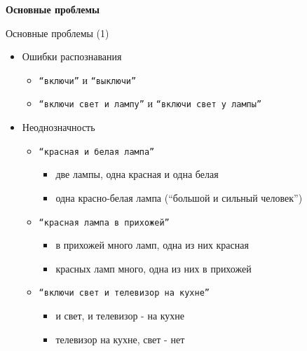 \documentclass{beamer}
\begin{document}
\begin{frame}{}
\begin{center}
	\textbf{Основные проблемы}\\
\end{center}
\end{frame}


\begin{frame}{Основные проблемы (1)}
\begin{itemize}
	\item Ошибки распознавания
	\bigskip
		\begin{itemize}
			\item \texttt{``включи''} и \texttt{``выключи''}
			\item \texttt{``включи свет и лампу''} и \texttt{``включи свет у лампы''}
		\end{itemize}
		\bigskip
	\item Неоднозначность
	\bigskip
		\begin{itemize}
			\item \texttt{``красная и белая лампа''}
				\begin{itemize}
					\item две лампы, одна красная и одна белая
					\item одна красно-белая лампа (``большой и сильный человек'')
				\end{itemize}
			\item \texttt{``красная лампа в прихожей''}
				\begin{itemize}
					\item в прихожей много ламп, одна из них красная
					\item красных ламп много, одна из них в прихожей
				\end{itemize}
			\item \texttt{``включи свет и телевизор на кухне''}
				\begin{itemize}
					\item и свет, и телевизор - на кухне
					\item телевизор на кухне, свет - нет
				\end{itemize}
		\end{itemize}
\end{itemize}
\end{frame}
\end{document}
